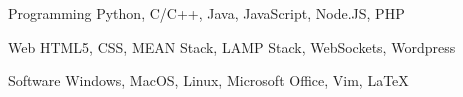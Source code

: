 


\begin{cvskills}


\cvskill
{Programming} %
{Python, C/C++, Java, JavaScript, Node.JS, PHP} %


\cvskill
{Web} %
{HTML5, CSS, MEAN Stack, LAMP Stack, WebSockets, Wordpress} %


\cvskill
{Software} %
{Windows, MacOS, Linux, Microsoft Office, Vim, LaTeX} %


\end{cvskills}